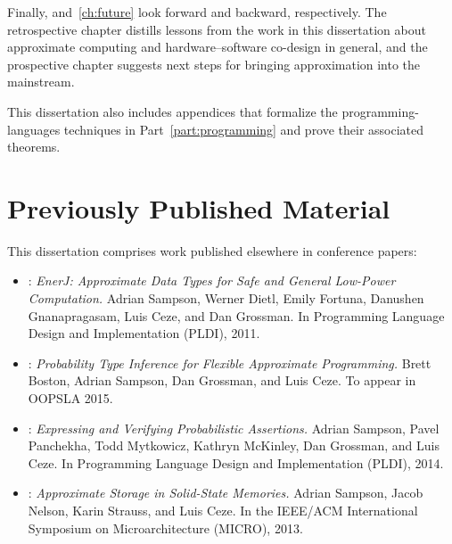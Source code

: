 Finally,  and~\ref{ch:future} look forward and
backward, respectively.
The retrospective chapter distills lessons from the work in this dissertation
about approximate computing and hardware--software co-design in general, and
the prospective chapter suggests next steps for bringing approximation into
the mainstream.

This dissertation also includes appendices that formalize the
programming-languages techniques in Part~\ref{part:programming} and prove
their associated theorems.


\section{Previously Published Material}

This dissertation comprises work published elsewhere in conference papers:

\begin{itemize}
\item {}:
\textit{EnerJ: Approximate Data Types for Safe and General Low-Power
Computation.}
Adrian Sampson, Werner Dietl, Emily Fortuna, Danushen Gnanapragasam, Luis Ceze, and Dan Grossman.
In Programming Language Design and Implementation (PLDI), 2011.
\cite{enerj}

\item {}:
\textit{Probability Type Inference for Flexible Approximate Programming.}
Brett Boston, Adrian Sampson, Dan Grossman, and Luis Ceze.
To appear in OOPSLA 2015.
\cite{decaf}

\item {}:
\textit{Expressing and Verifying Probabilistic Assertions.}
Adrian Sampson, Pavel Panchekha, Todd Mytkowicz, Kathryn McKinley, Dan Grossman, and Luis Ceze.
In Programming Language Design and Implementation (PLDI), 2014.
\cite{passert}

\item {}:
\textit{Approximate Storage in Solid-State Memories.}
Adrian Sampson, Jacob Nelson, Karin Strauss, and Luis Ceze.
In the IEEE/ACM International Symposium on Microarchitecture (MICRO), 2013.
\cite{approxstorage}
\end{itemize}
